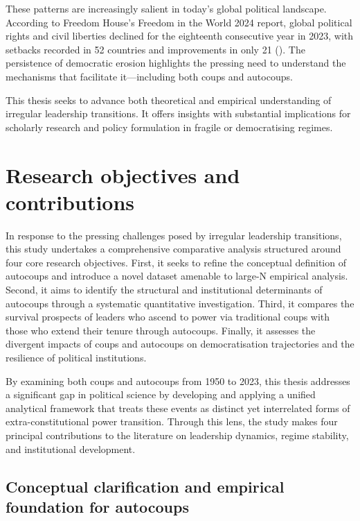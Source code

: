 \documentclass[
  12pt,
]{report}
\begin{document}
These patterns are increasingly salient in today's global political
landscape. According to Freedom House's Freedom in the World 2024
report, global political rights and civil liberties declined for the
eighteenth consecutive year in 2023, with setbacks recorded in 52
countries and improvements in only 21
(). The
persistence of democratic erosion highlights the pressing need to
understand the mechanisms that facilitate it---including both coups and
autocoups.

This thesis seeks to advance both theoretical and empirical
understanding of irregular leadership transitions. It offers insights
with substantial implications for scholarly research and policy
formulation in fragile or democratising regimes.

\section{Research objectives and
contributions}\label{research-objectives-and-contributions}

In response to the pressing challenges posed by irregular leadership
transitions, this study undertakes a comprehensive comparative analysis
structured around four core research objectives. First, it seeks to
refine the conceptual definition of autocoups and introduce a novel
dataset amenable to large-N empirical analysis. Second, it aims to
identify the structural and institutional determinants of autocoups
through a systematic quantitative investigation. Third, it compares the
survival prospects of leaders who ascend to power via traditional coups
with those who extend their tenure through autocoups. Finally, it
assesses the divergent impacts of coups and autocoups on democratisation
trajectories and the resilience of political institutions.

By examining both coups and autocoups from 1950 to 2023, this thesis
addresses a significant gap in political science by developing and
applying a unified analytical framework that treats these events as
distinct yet interrelated forms of extra-constitutional power
transition. Through this lens, the study makes four principal
contributions to the literature on leadership dynamics, regime
stability, and institutional development.

\subsection*{Conceptual clarification and empirical foundation for
autocoups}\label{conceptual-clarification-and-empirical-foundation-for-autocoups}
\end{document}

